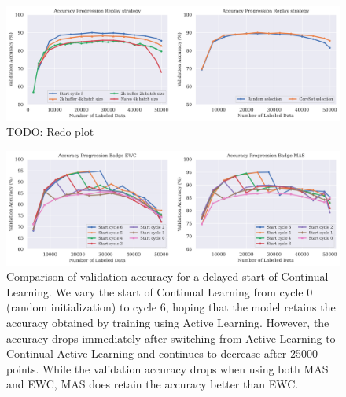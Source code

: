 \begin{figure} [ht]
    \centering
    \includegraphics[width=\linewidth]{images/results_CAL/replay_CAL.png}
    \caption[Continual Active Learning Badge 4000 batch size]{TODO: Redo plot}
    \label{fig:Evaluation:Results:CAL:Replay}
\end{figure}

\begin{figure}[ht]
    \centering
    \includegraphics[width=\linewidth]{images/results_CAL/Delayed_start_CAL.png}
    \caption[Continual Active Learning Badge 4000 batch size]{Comparison of validation accuracy for a delayed start of Continual Learning. We vary the start of Continual Learning from 
    cycle 0 (random initialization) to cycle 6, hoping that the model retains the accuracy obtained by training using Active Learning. However, the accuracy drops immediately after switching
    from Active Learning to Continual Active Learning and continues to decrease after 25000 points. While the validation accuracy drops when using both MAS and EWC, MAS does retain the accuracy
    better than EWC.}
    \label{fig:Evaluation:Results:CAL:DelayedStart}
\end{figure}


